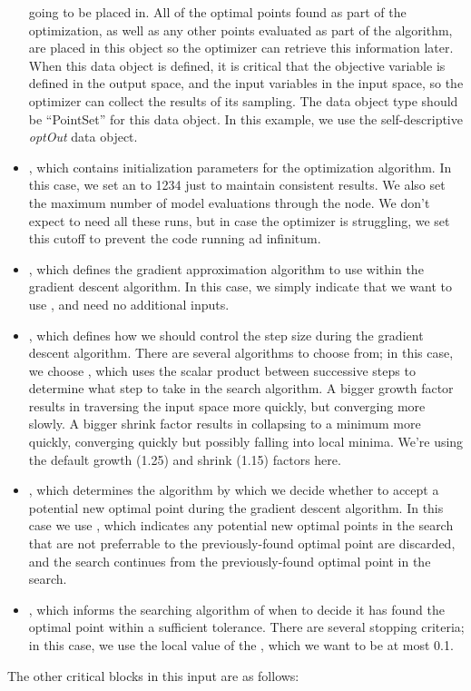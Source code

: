 \begin{itemize}
    going to be placed in.  All of the optimal points found as part of the optimization, as well as any other
    points evaluated as part of the algorithm, are placed in this object so the optimizer can retrieve this
    information later.  When this data object is defined, it is critical that the objective variable is
    defined in the output space, and the input variables in the input space, so the optimizer can collect the
    results of its sampling.  The data object type should be ``PointSet'' for this data object.  In this
    example, we use the self-descriptive \emph{optOut} data object.
  \item {}, which contains initialization parameters for the optimization
    algorithm. In this case, we set an  to 1234 just to maintain consistent
    results. We also set the maximum number of model evaluations through the  node.
    We don't expect to need all these runs, but in case the optimizer is struggling, we set this
    cutoff to prevent the code running ad infinitum.
  \item {}, which defines the gradient approximation algorithm to use within the
    gradient descent algorithm. In this case,
    we simply indicate that we want to use , and need no additional inputs.
  \item {}, which defines how we should control the step size during the gradient
    descent algorithm. There are several algorithms to choose from; in this case, we choose
    , which uses the scalar product between successive steps to determine
    what step to take in the search algorithm. A bigger growth factor results in traversing the input space more
    quickly, but converging more slowly. A bigger shrink factor results in collapsing to a minimum
    more quickly, converging quickly but possibly falling into local minima. We're using the default
    growth (1.25) and shrink (1.15) factors here.
  \item {}, which determines the algorithm by which we decide whether to accept a
    potential new optimal point during the gradient descent algorithm. In this case we use
    , which indicates any potential new optimal points in the search that are not
    preferrable to the previously-found optimal point are discarded, and the search continues from
    the previously-found optimal point in the search.
  \item {}, which informs the searching algorithm of when to decide it has found
    the optimal point within a sufficient tolerance. There are several stopping criteria; in this
    case, we use the local value of the , which we want to be at most 0.1.
\end{itemize}
The other critical blocks in this input are as follows:

